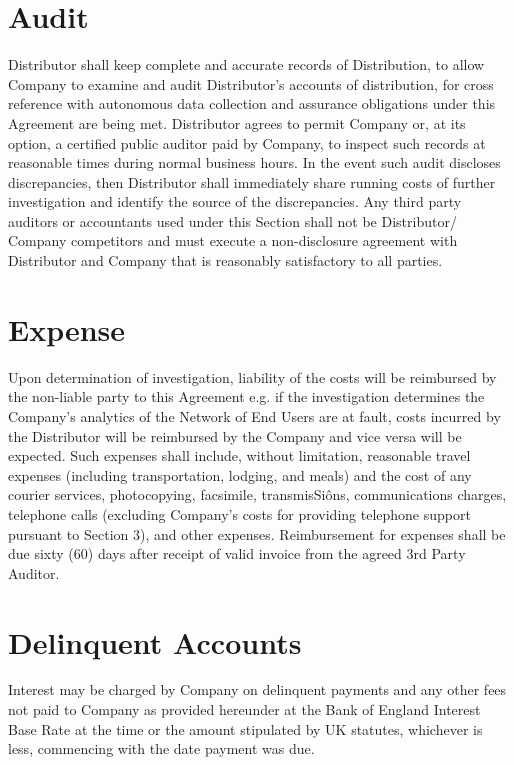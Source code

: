 \documentclass[letterpaper,10pt,english]{sphinxmanual}
\begin{document}
\section{Audit}
\label{\detokenize{licencefees:audit}}
Distributor shall keep complete and accurate records of Distribution, to allow Company to examine and audit Distributor’s accounts of distribution, for cross reference with autonomous data collection and assurance obligations under this Agreement are being met. Distributor agrees to permit Company or, at its option, a certified public auditor paid by Company, to inspect such records at reasonable times during normal business hours. In the event such audit discloses discrepancies, then Distributor shall immediately share running costs of further investigation and identify the source of the discrepancies. Any third party auditors or accountants used under this Section shall not be Distributor/ Company competitors and must execute a non-disclosure agreement with Distributor and Company that is reasonably satisfactory to all parties.


\section{Expense}
\label{\detokenize{licencefees:expense}}
Upon determination of investigation, liability of the costs will be reimbursed by the non-liable party to this Agreement e.g. if the investigation determines the Company’s analytics of the Network of End Users are at fault, costs incurred by the Distributor will be reimbursed by the Company and vice versa will be expected. Such expenses shall include, without limitation, reasonable travel expenses (including transportation, lodging, and meals) and the cost of any courier services, photocopying, facsimile, transmisSiôns, communications charges, telephone calls (excluding Company’s costs for providing telephone support pursuant to Section 3), and other expenses.  Reimbursement for expenses shall be due sixty (60) days after receipt of valid invoice from the agreed 3rd Party Auditor.


\section{Delinquent Accounts}
\label{\detokenize{licencefees:delinquent-accounts}}
Interest may be charged by Company on delinquent payments and any other fees not paid to Company as provided hereunder at the Bank of England Interest Base Rate at the time or the amount stipulated by UK statutes, whichever is less, commencing with the date payment was due.
\end{document}

